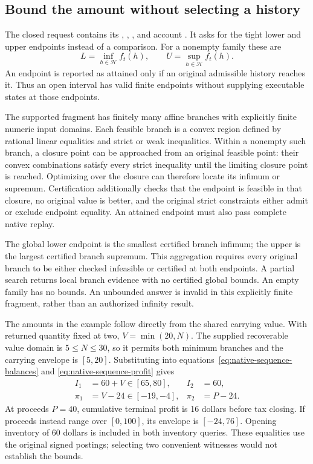 \subsection{Bound the amount without selecting a history}

The closed  request contains its ,
, ,  and account . It asks
for the tight lower and upper endpoints instead of a comparison. For a
nonempty family these are
\begin{equation}
\label{eq:family-outcome-envelope}
 L=\inf_{h\in\mathcal H} f_t(h),\qquad
 U=\sup_{h\in\mathcal H} f_t(h).
\end{equation}
An endpoint is reported as attained only if an original admissible history
reaches it. Thus an open interval has valid finite endpoints without supplying
executable states at those endpoints.

The supported fragment has finitely many affine branches with explicitly
finite numeric input domains. Each feasible branch is a convex region defined
by rational linear equalities and strict or weak inequalities. Within a
nonempty such branch, a closure point can be approached from an original
feasible point: their convex combinations satisfy every strict inequality
until the limiting closure point is reached. Optimizing over the closure can
therefore locate its infimum or supremum. Certification additionally checks
that the endpoint is feasible in that closure, no original value is better,
and the original strict constraints either admit or exclude endpoint equality.
An attained endpoint must also pass complete native replay.

The global lower endpoint is the smallest certified branch infimum; the upper
is the largest certified branch supremum. This aggregation requires every
original branch to be either checked infeasible or certified at both endpoints.
A partial search returns local branch evidence with no certified global bounds.
An empty family has no bounds. An unbounded answer is invalid in this explicitly
finite fragment, rather than an authorized infinity result.

The amounts in the example follow directly from the shared carrying value.
With returned quantity fixed at two, \(V=\min(20,N)\). The supplied recoverable
value domain is \(5\leq N\leq30\), so it permits both minimum branches and the carrying
envelope is \([5,20]\). Substituting into
equations~\eqref{eq:native-sequence-balances} and
\eqref{eq:native-sequence-profit} gives
\begin{align}
\label{eq:family-outcome-example}
 I_1&=60+V\in[65,80], & I_2&=60,\\
 \pi_1&=V-24\in[-19,-4], & \pi_2&=P-24.
\end{align}
At proceeds \(P=40\), cumulative terminal profit is 16 dollars before tax
closing. If proceeds instead range over \([0,100]\), its envelope is
\([-24,76]\). Opening inventory of 60 dollars is included in both inventory queries.
These equalities use the original signed postings; selecting two convenient
witnesses would not establish the bounds.

